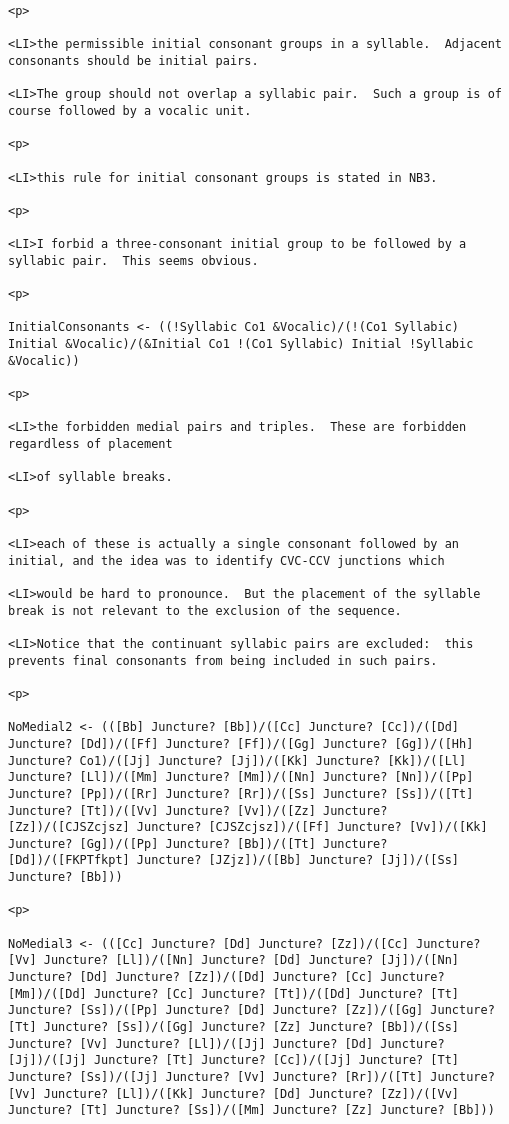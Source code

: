 \documentclass[12pt]{article}
\begin{document}
\begin{lstlisting}
<p>

<LI>the permissible initial consonant groups in a syllable.  Adjacent consonants should be initial pairs.

<LI>The group should not overlap a syllabic pair.  Such a group is of course followed by a vocalic unit.

<p>

<LI>this rule for initial consonant groups is stated in NB3.

<p>

<LI>I forbid a three-consonant initial group to be followed by a syllabic pair.  This seems obvious.

<p>

InitialConsonants <- ((!Syllabic Co1 &Vocalic)/(!(Co1 Syllabic) Initial &Vocalic)/(&Initial Co1 !(Co1 Syllabic) Initial !Syllabic &Vocalic))

<p>

<LI>the forbidden medial pairs and triples.  These are forbidden regardless of placement

<LI>of syllable breaks.

<p>

<LI>each of these is actually a single consonant followed by an initial, and the idea was to identify CVC-CCV junctions which

<LI>would be hard to pronounce.  But the placement of the syllable break is not relevant to the exclusion of the sequence.

<LI>Notice that the continuant syllabic pairs are excluded:  this prevents final consonants from being included in such pairs.

<p>

NoMedial2 <- (([Bb] Juncture? [Bb])/([Cc] Juncture? [Cc])/([Dd] Juncture? [Dd])/([Ff] Juncture? [Ff])/([Gg] Juncture? [Gg])/([Hh] Juncture? Co1)/([Jj] Juncture? [Jj])/([Kk] Juncture? [Kk])/([Ll] Juncture? [Ll])/([Mm] Juncture? [Mm])/([Nn] Juncture? [Nn])/([Pp] Juncture? [Pp])/([Rr] Juncture? [Rr])/([Ss] Juncture? [Ss])/([Tt] Juncture? [Tt])/([Vv] Juncture? [Vv])/([Zz] Juncture? [Zz])/([CJSZcjsz] Juncture? [CJSZcjsz])/([Ff] Juncture? [Vv])/([Kk] Juncture? [Gg])/([Pp] Juncture? [Bb])/([Tt] Juncture? [Dd])/([FKPTfkpt] Juncture? [JZjz])/([Bb] Juncture? [Jj])/([Ss] Juncture? [Bb]))

<p>

NoMedial3 <- (([Cc] Juncture? [Dd] Juncture? [Zz])/([Cc] Juncture? [Vv] Juncture? [Ll])/([Nn] Juncture? [Dd] Juncture? [Jj])/([Nn] Juncture? [Dd] Juncture? [Zz])/([Dd] Juncture? [Cc] Juncture? [Mm])/([Dd] Juncture? [Cc] Juncture? [Tt])/([Dd] Juncture? [Tt] Juncture? [Ss])/([Pp] Juncture? [Dd] Juncture? [Zz])/([Gg] Juncture? [Tt] Juncture? [Ss])/([Gg] Juncture? [Zz] Juncture? [Bb])/([Ss] Juncture? [Vv] Juncture? [Ll])/([Jj] Juncture? [Dd] Juncture? [Jj])/([Jj] Juncture? [Tt] Juncture? [Cc])/([Jj] Juncture? [Tt] Juncture? [Ss])/([Jj] Juncture? [Vv] Juncture? [Rr])/([Tt] Juncture? [Vv] Juncture? [Ll])/([Kk] Juncture? [Dd] Juncture? [Zz])/([Vv] Juncture? [Tt] Juncture? [Ss])/([Mm] Juncture? [Zz] Juncture? [Bb]))


\end{lstlisting}
\end{document}
